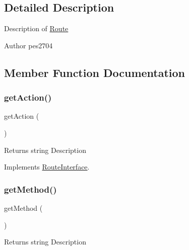 \subsection{Detailed Description}
Description of \mbox{\hyperlink{class_pes_1_1_router_1_1_route}{Route}}

\begin{DoxyAuthor}{Author}
pes2704 
\end{DoxyAuthor}


\subsection{Member Function Documentation}
\mbox{\label{class_pes_1_1_router_1_1_route_a189a4abe5faf11f4320d5d3f1d3d1715}} 
\subsubsection{\texorpdfstring{get\+Action()}{getAction()}}
{\footnotesize\ttfamily get\+Action (\begin{DoxyParamCaption}{ }\end{DoxyParamCaption})}

\begin{DoxyReturn}{Returns}
string Description 
\end{DoxyReturn}


Implements \mbox{\hyperlink{interface_pes_1_1_router_1_1_route_interface_a189a4abe5faf11f4320d5d3f1d3d1715}{Route\+Interface}}.

\mbox{\label{class_pes_1_1_router_1_1_route_af3e37e1a6ed9b8c87f86f659873a83b7}} 
\subsubsection{\texorpdfstring{get\+Method()}{getMethod()}}
{\footnotesize\ttfamily get\+Method (\begin{DoxyParamCaption}{ }\end{DoxyParamCaption})}

\begin{DoxyReturn}{Returns}
string Description 
\end{DoxyReturn}



